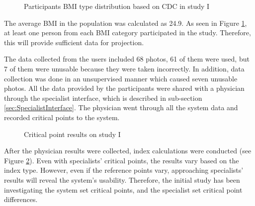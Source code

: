 \begin{figure}[htbp]
\centering
{}
\caption{Participants BMI type distribution based on CDC in study I}
\label{fig:StudyIParticipantsBMITypeDistribution}
\end{figure}

The average BMI in the population was calculated as 24.9. As seen in Figure \ref{fig:StudyIParticipantsBMITypeDistribution}, at least one person from each BMI category participated in the study. Therefore, this will provide sufficient data for projection.

The data collected from the users included 68 photos, 61 of them were used, but 7 of them were unusable because they were taken incorrectly. In addition, data collection was done in an unsupervised manner which caused seven unusable photos. All the data provided by the participants were shared with a physician through the specialist interface, which is described in sub-section \ref{sec:SpecialistInterface}. The physician went through all the system data and recorded critical points to the system.

\begin{figure}[htbp]
\centering
{}
\caption{Critical point results on study I}
\label{fig:StudyICriticalPointResult}
\end{figure}

After the physician results were collected, index calculations were conducted (see Figure \ref{fig:StudyICriticalPointResult}). Even with specialists' critical points, the results vary based on the index type. However, even if the reference points vary, approaching specialists' results will reveal the system's usability. Therefore, the initial study has been investigating the system set critical points, and the specialist set critical point differences.

